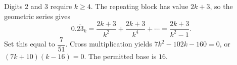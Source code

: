 Digits 2 and 3 require $k\ge4$. The repeating block has value $2k+3$, so the geometric series gives
\[0.\overline{23}_k=\dfrac{2k+3}{k^2}+\dfrac{2k+3}{k^4}+\cdots=\dfrac{2k+3}{k^2-1}.\]
Set this equal to $\dfrac{7}{51}$. Cross multiplication yields $7k^2-102k-160=0$, or $(7k+10)(k-16)=0$. The permitted base is $\boxed{16}$.
